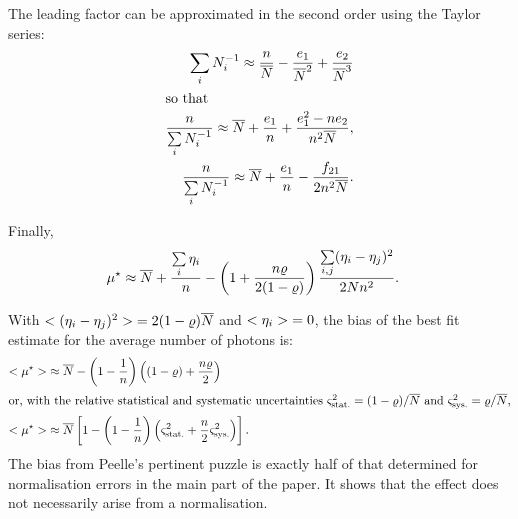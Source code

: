 \documentclass{pasa}
\begin{document}
The leading factor can be approximated in the second order using the Taylor series:
\begin{align*}
    \sum_i N_i^{-1} \approx \frac{n}{\overline{N}}
                           - \frac{e_1}{\overline{N}^2} 
                           + \frac{e_2}{\overline{N}^3}\\
\intertext{so that}
    \frac{n}{\sum\limits_i N_i^{-1}} \approx
            \overline{N} + \frac{e_1}{n} + \frac{e_1^2-ne_2}{n^2\overline{N}},\\
    \frac{n}{\sum\limits_i N_i^{-1}} \approx
            \overline{N} + \frac{e_1}{n} - \frac{f_{21}}{2n^2\overline{N}}.
\end{align*}

Finally,
\begin{align*}
    \mu^\star &\approx \overline{N}  + \frac{\sum\limits_i \eta_i}{n}
            - \left(1 + \frac{n\varrho}{2(1-\varrho)} \right)
                    \frac{\sum\limits_{i,j} (\eta_i - \eta_j) ^2}{2Nn^2}.
\end{align*}

With $ {<(\eta_i-\eta_j)^2>}  = 2(1-\varrho)\overline{N}$ and $ {<\eta_i>}  = 0$, the bias of the best fit estimate for the average number of photons is:
\begin{align*}
     {<\ensuremath{\mu}^\star>}  &\approx \overline{N} - \left(1 - \frac 1n\right) \left( 
                    (1-\varrho) + \frac{n\varrho}{2}\right)\\
\intertext{or, with the relative statistical and systematic uncertainties $\varsigma_\text{stat.}^2 = (1-\varrho)/\overline{N}$ and $\varsigma_\text{sys.}^2 = \varrho/\overline{N}$,}
     {<\ensuremath{\mu}^\star>}  &\approx \overline{N} \left[ 1 - \left(1 - \frac 1n\right)
                \left(\varsigma_\text{stat.}^2 + \frac n2 \varsigma_\text{sys.}^2\right)\right].
\end{align*}
The bias from Peelle's pertinent puzzle is exactly half of that determined for normalisation errors in the main part of the paper.  It shows that the effect does not necessarily arise from a normalisation.




\end{document}
